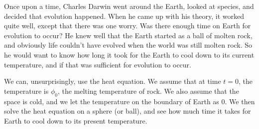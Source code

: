 \documentclass[a4paper]{article}
\begin{document}
\begin{eg}
  Once upon a time, Charles Darwin went around the Earth, looked at species, and decided that evolution happened. When he came up with his theory, it worked quite well, except that there was one worry. Was there enough time on Earth for evolution to occur? He knew well that the Earth started as a ball of molten rock, and obviously life couldn't have evolved when the world was still molten rock. So he would want to know how long it took for the Earth to cool down to its current temperature, and if that was sufficient for evolution to occur.

  We can, unsurprisingly, use the heat equation. We assume that at time $t = 0$, the temperature is $\phi_0$, the melting temperature of rock. We also assume that the space is cold, and we let the temperature on the boundary of Earth as $0$. We then solve the heat equation on a sphere (or ball), and see how much time it takes for Earth to cool down to its present temperature.


\end{eg}
\end{document}
